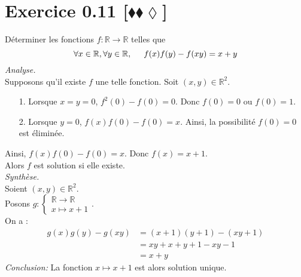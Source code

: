 \documentclass[10pt]{article}
\begin{document}
\section*{Exercice 0.11 [$\blacklozenge\blacklozenge\lozenge$]}
\begin{tcolorbox}[enhanced, width=6in, center, size=fbox, fontupper=\large, drop shadow southwest]
    Déterminer les fonctions $f: \mathbb{R} \rightarrow \mathbb{R}$ telles que 
    \begin{equation*}
        \forall{x\in\mathbb{R},\forall{y\in\mathbb{R}}, \hspace{0.5cm} f(x)f(y) - f(xy) = x + y}
    \end{equation*}
    \emph{Analyse.}\\
    Supposons qu'il existe $f$ une telle fonction. Soit $(x,y)\in\mathbb{R}^2$.
    \begin{itemize}
        \item[1.] Lorsque $x=y=0$, $f^2(0)-f(0)=0$. Donc $f(0) = 0$ ou $f(0) = 1$.
        \item[2.] Lorsque $y=0$, $f(x)f(0)-f(0)=x$. Ainsi, la possibilité $f(0)=0$ est éliminée.
    \end{itemize}
    Ainsi, $f(x)f(0)-f(0)=x$. Donc $f(x)=x+1$.\\
    Alors $f$ est solution si elle existe.\\[0.25cm]
    \emph{Synthèse.}\\
    Soient $(x,y)\in\mathbb{R}^2$.\\
    Posons $g: \begin{cases}\mathbb{R}\rightarrow\mathbb{R}\\x\mapsto{x+1}\end{cases}$.\\
    On a :
    \begin{align*}
        g(x)g(y)-g(xy)
        &=(x+1)(y+1)-(xy+1)\\
        &=xy+x+y+1-xy-1\\
        &=x+y
    \end{align*}
    \emph{Conclusion:}
    La fonction $x\mapsto x+1$ est alors solution unique.
\end{tcolorbox}
\end{document}

